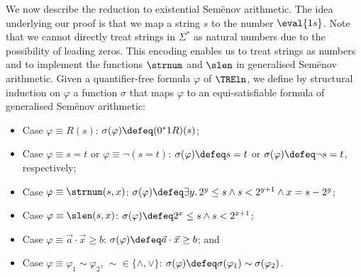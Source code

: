 We now describe the reduction to existential Sem{\"e}nov
arithmetic. The idea underlying our proof is that we map a string $s$
to the number $\eval{1s}$. Note that we cannot directly treat strings
in $\Sigma^*$ as natural numbers due to the possibility of leading
zeros. This encoding enables us to treat strings as numbers and to
implement the functions $\strnum$ and $\slen$ in generalised
Sem{\"e}nov arithmetic. Given a quantifier-free formula $\varphi$ of
$\TREln$, we define by structural induction on $\varphi$ a function
$\sigma$ that maps $\varphi$ to an equi-satisfiable formula of
generalised Sem{\"e}nov arithmetic:
%
\begin{itemize}
\item Case $\varphi \equiv R(s)$: $\sigma(\varphi)\defeq (0^*1 R)(s)$;
\item Case $\varphi \equiv s=t$ or $\varphi \equiv \neg(s=t)$:
  $\sigma(\varphi) \defeq s=t$ or $\sigma(\varphi) \defeq \neg s=t$,
  respectively;
\item Case $\varphi \equiv \strnum(s,x)$: $\sigma(\varphi)\defeq
  \exists y.\, 2^y\leq s\land s< 2^{y+1} \land x = s-2^y$;
\item Case $\varphi \equiv \slen(s,x)$: $\sigma(\varphi)\defeq 2^{x}\le s\land s < 2^{x+1}$;
\item Case $\varphi \equiv \vec a\cdot \vec x \ge b$: $\sigma(\varphi) \defeq \vec a\cdot \vec x \ge b$; and
\item Case $\varphi \equiv \varphi_1 \sim \varphi_2$, ${}\sim{} \in \{
  \wedge, \vee \}$: $\sigma(\varphi)\defeq \sigma(\varphi_1) \sim
  \sigma(\varphi_2)$.
\end{itemize}
%

